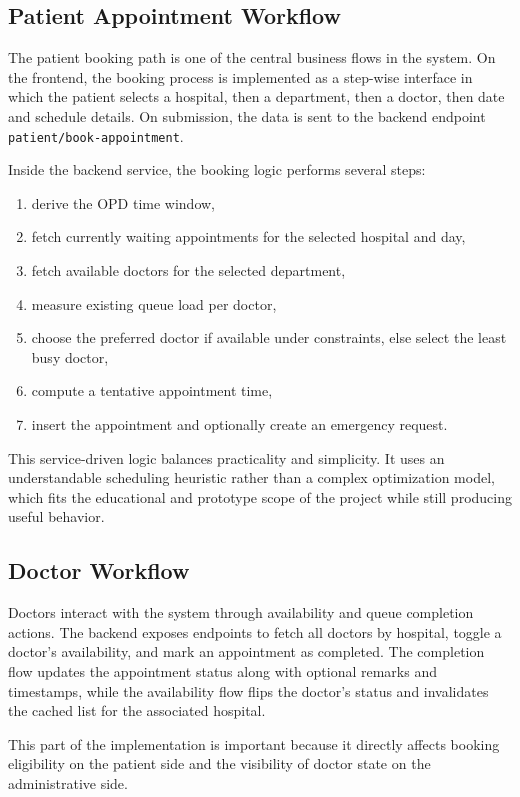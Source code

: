 \documentclass[12pt,onecolumn]{IEEEtran}
\begin{document}
\subsection{Patient Appointment Workflow}
The patient booking path is one of the central business flows in the system. On the frontend, the booking process is implemented as a step-wise interface in which the patient selects a hospital, then a department, then a doctor, then date and schedule details. On submission, the data is sent to the backend endpoint \texttt{patient/book-appointment}.

Inside the backend service, the booking logic performs several steps:
\begin{enumerate}
    \item derive the OPD time window,
    \item fetch currently waiting appointments for the selected hospital and day,
    \item fetch available doctors for the selected department,
    \item measure existing queue load per doctor,
    \item choose the preferred doctor if available under constraints, else select the least busy doctor,
    \item compute a tentative appointment time,
    \item insert the appointment and optionally create an emergency request.
\end{enumerate}

This service-driven logic balances practicality and simplicity. It uses an understandable scheduling heuristic rather than a complex optimization model, which fits the educational and prototype scope of the project while still producing useful behavior.

\subsection{Doctor Workflow}
Doctors interact with the system through availability and queue completion actions. The backend exposes endpoints to fetch all doctors by hospital, toggle a doctor's availability, and mark an appointment as completed. The completion flow updates the appointment status along with optional remarks and timestamps, while the availability flow flips the doctor's status and invalidates the cached list for the associated hospital.

This part of the implementation is important because it directly affects booking eligibility on the patient side and the visibility of doctor state on the administrative side.
\end{document}
